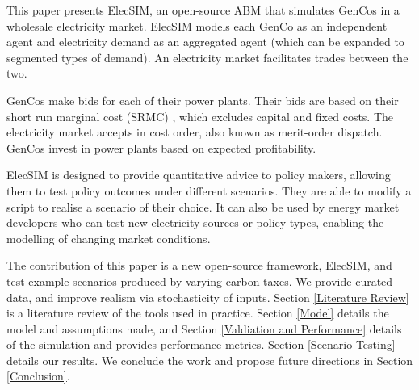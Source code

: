 This paper presents ElecSIM, an open-source ABM that simulates GenCos in a wholesale electricity market. ElecSIM models each GenCo as an independent agent and electricity demand as an aggregated agent (which can be expanded to segmented types of demand). An electricity market facilitates trades between the two. 

GenCos make bids for each of their power plants. Their bids are based on their short run marginal cost (SRMC) \cite{Perloff2012}, which excludes capital and fixed costs. The electricity market accepts in cost order, also known as merit-order dispatch. GenCos invest in power plants based on expected profitability.	

ElecSIM is designed to provide quantitative advice to policy makers, allowing them to test policy outcomes under different scenarios. They are able to modify a script to realise a scenario of their choice. It can also be used by energy market developers who can test new electricity sources or policy types, enabling the modelling of changing market conditions.







The contribution of this paper is a new open-source framework, ElecSIM, and test example scenarios produced by varying carbon taxes. We provide curated data, and improve realism via stochasticity of inputs. Section \ref{Literature Review} is a literature review of the tools used in practice. Section \ref{Model} details the model and assumptions made, and Section \ref{Valdiation and Performance} details of the simulation and provides performance metrics. Section \ref{Scenario Testing} details our results. We conclude the work and propose future directions in Section \ref{Conclusion}.


